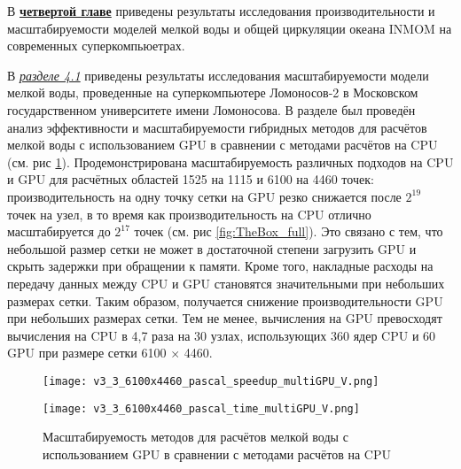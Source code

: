 В \underline{\textbf{четвертой главе}} приведены результаты исследования производительности и масштабируемости моделей мелкой воды и общей циркуляции океана INMOM на современных суперкомпьюетрах.

В \underline{\textit{разделе 4.1}} приведены результаты исследования масштабируемости модели мелкой воды, проведенные на суперкомпьютере Ломоносов-2 в Мос­ковском государственном университете имени Ломоносова.
В разделе был проведён анализ эффективности и масштабируемости гибридных методов для расчётов мелкой воды с использованием GPU в сравнении с методами расчётов на CPU (см. рис \ref{fig:TheBox}). 
Продемонстрирована масштабируемость различных подходов на CPU и GPU для расчётных областей 1525 на 1115 и 6100 на 4460 точек: производительность на одну точку сетки на GPU резко снижается после $2^{19}$ точек на узел, в то время как производительность на CPU отлично масштабируется до $2^{17}$ точек (см. рис \ref{fig:TheBox_full}). Это связано с тем, что небольшой размер сетки не может в достаточной степени загрузить GPU и скрыть задержки при обращении к памяти. Кроме того, накладные расходы на передачу данных между CPU и GPU становятся значительными при небольших размерах сетки. Таким образом, получается снижение производительности GPU при небольших размерах сетки.  Тем не менее, вычисления на GPU превосходят вычисления на CPU в 4,7 раза на 30 узлах, использующих 360 ядер CPU и 60 GPU при размере сетки 6100 $\times$ 4460.  

\begin{figure}[!ht]
	\begin{minipage}{0.5\linewidth}
	\centering
	\texttt{[image: v3\_3\_6100x4460\_pascal\_speedup\_multiGPU\_V.png]}
	\end{minipage}
	\begin{minipage}{0.5\linewidth}
	\centering
    \texttt{[image: v3\_3\_6100x4460\_pascal\_time\_multiGPU\_V.png]}
	\end{minipage}
	\vspace{3pt}
	\caption{Масштабируемость методов для расчётов мелкой воды с использованием GPU в сравнении с методами расчётов на CPU}
	\label{fig:TheBox}
\end{figure}


